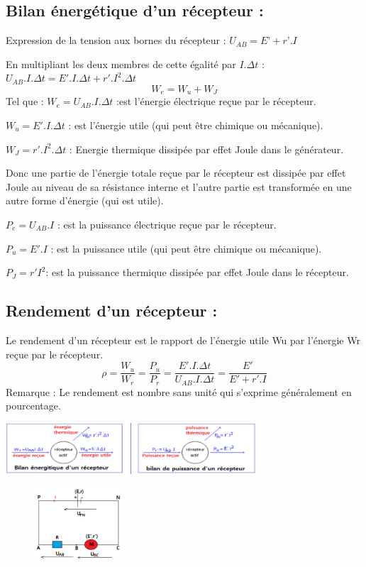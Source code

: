 \documentclass[12pt]{article}
\begin{document}
\subsection{Bilan énergétique d’un récepteur :}
Expression de la tension aux bornes du récepteur : $U_{AB}=E’+r’.I$

En multipliant les deux membres de cette égalité par $I.\Delta{t}$  :  $U_{AB}.I. \Delta{t} = E'. I. \Delta{t} + r'. I^2. \Delta{t}$
  $$W_e = W_u + W_J $$
Tel que  :  
  $W_e = U_{AB}. I. \Delta{t}$ :est l’énergie électrique reçue par le récepteur. 

  $W_u = E'. I. \Delta{t}$ : est l’énergie utile (qui peut être chimique ou mécanique).

  $W_J = r'. I^2.\Delta{t}$ : Energie thermique dissipée par effet Joule dans le générateur.

Donc une partie de l’énergie totale reçue par le récepteur est dissipée par effet Joule au niveau de sa résistance interne et l’autre
partie est transformée en une autre forme d’énergie (qui est utile).

$P_e = U_{AB}.I$ : est la puissance électrique reçue par le récepteur.

$P_u= E'.I$ : est la puissance utile (qui peut être chimique ou mécanique).

$ P_J=r'I^2$: est la puissance thermique dissipée par effet Joule dans le récepteur.

\subsection{Rendement d’un récepteur : }
Le rendement d’un récepteur est le rapport de l’énergie utile Wu par l’énergie Wr reçue par le récepteur.
$$\rho = \frac{W_u}{W_r} = \frac{P_u}{P_r} = \frac{E'.I.\Delta{t}}{U_{AB}.I.\Delta{t}} = \frac{E'}{E' + r'.I}$$
Remarque : Le rendement est nombre sans unité qui s’exprime généralement en pourcentage.

\begin{center}
  \includegraphics[width=0.7\textwidth]{./img/Puissance_utile_Pu_Pe.png}
\end{center}

\begin{figure}
    \includegraphics[width=0.3\textwidth]{./img/circuit_serie_morot_resistance.png}
\end{figure}
\end{document}
